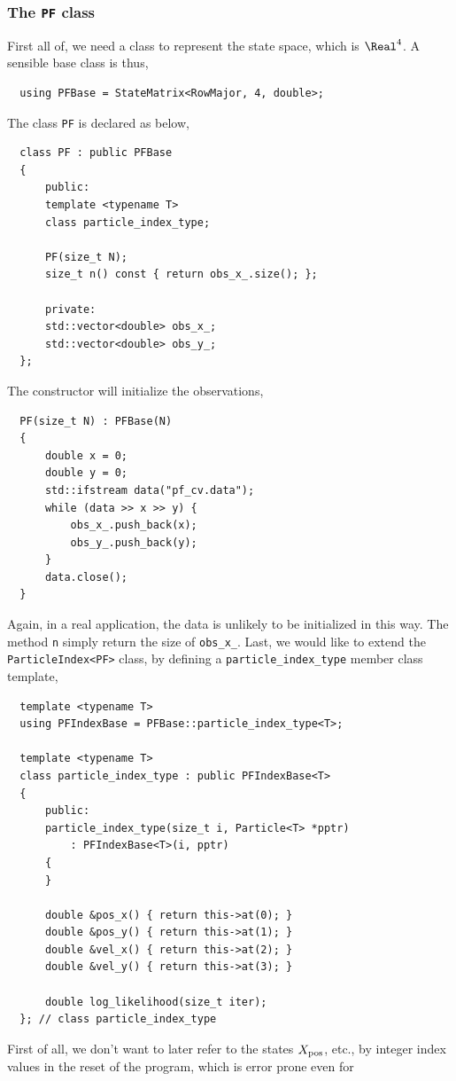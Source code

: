 \subsubsection{The \texttt{PF} class}

First all of, we need a class to represent the state space, which is $\Real^4$.
A sensible base class is thus,
\begin{Verbatim}
  using PFBase = StateMatrix<RowMajor, 4, double>;
\end{Verbatim}
The class \verb|PF| is declared as below,
\begin{Verbatim}
  class PF : public PFBase
  {
      public:
      template <typename T>
      class particle_index_type;

      PF(size_t N);
      size_t n() const { return obs_x_.size(); };

      private:
      std::vector<double> obs_x_;
      std::vector<double> obs_y_;
  };
\end{Verbatim}
The constructor will initialize the observations,
\begin{Verbatim}
  PF(size_t N) : PFBase(N)
  {
      double x = 0;
      double y = 0;
      std::ifstream data("pf_cv.data");
      while (data >> x >> y) {
          obs_x_.push_back(x);
          obs_y_.push_back(y);
      }
      data.close();
  }
\end{Verbatim}
Again, in a real application, the data is unlikely to be initialized in this
way. The method \verb|n| simply return the size of \verb|obs_x_|. Last, we
would like to extend the \verb|ParticleIndex<PF>| class, by defining a
\verb|particle_index_type| member class template,
\begin{Verbatim}
  template <typename T>
  using PFIndexBase = PFBase::particle_index_type<T>;

  template <typename T>
  class particle_index_type : public PFIndexBase<T>
  {
      public:
      particle_index_type(size_t i, Particle<T> *pptr)
          : PFIndexBase<T>(i, pptr)
      {
      }

      double &pos_x() { return this->at(0); }
      double &pos_y() { return this->at(1); }
      double &vel_x() { return this->at(2); }
      double &vel_y() { return this->at(3); }

      double log_likelihood(size_t iter);
  }; // class particle_index_type
\end{Verbatim}
First of all, we don't want to later refer to the states $X_{\mathrm{pos}}$, etc., by
integer index values in the reset of the program, which is error prone even for

